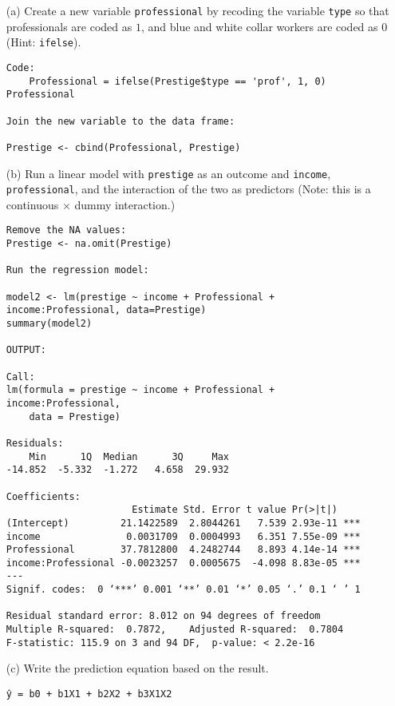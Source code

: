 \documentclass[12pt,letterpaper]{article}
\begin{document}
\newpage
\begin{enumerate}
	
	\item [(a)]
	Create a new variable \texttt{professional} by recoding the variable \texttt{type} so that professionals are coded as $1$, and blue and white collar workers are coded as $0$ (Hint: \texttt{ifelse}).
	
	\vspace{1cm}
\begin{verbatim}
Code:
    Professional = ifelse(Prestige$type == 'prof', 1, 0)
Professional

Join the new variable to the data frame:

Prestige <- cbind(Professional, Prestige)
\end{verbatim}
	
	\item [(b)]
	Run a linear model with \texttt{prestige} as an outcome and \texttt{income}, \texttt{professional}, and the interaction of the two as predictors (Note: this is a continuous $\times$ dummy interaction.)
	
	\vspace{1cm}

\begin{verbatim}
Remove the NA values:
Prestige <- na.omit(Prestige)

Run the regression model:

model2 <- lm(prestige ~ income + Professional + income:Professional, data=Prestige)
summary(model2)

OUTPUT:

Call:
lm(formula = prestige ~ income + Professional + income:Professional, 
    data = Prestige)

Residuals:
    Min      1Q  Median      3Q     Max 
-14.852  -5.332  -1.272   4.658  29.932 

Coefficients:
                      Estimate Std. Error t value Pr(>|t|)    
(Intercept)         21.1422589  2.8044261   7.539 2.93e-11 ***
income               0.0031709  0.0004993   6.351 7.55e-09 ***
Professional        37.7812800  4.2482744   8.893 4.14e-14 ***
income:Professional -0.0023257  0.0005675  -4.098 8.83e-05 ***
---
Signif. codes:  0 ‘***’ 0.001 ‘**’ 0.01 ‘*’ 0.05 ‘.’ 0.1 ‘ ’ 1

Residual standard error: 8.012 on 94 degrees of freedom
Multiple R-squared:  0.7872,	Adjusted R-squared:  0.7804 
F-statistic: 115.9 on 3 and 94 DF,  p-value: < 2.2e-16
\end{verbatim}
	\item [(c)]
	Write the prediction equation based on the result.
\begin{verbatim}
ŷ = b0 + b1X1 + b2X2 + b3X1X2


\end{verbatim}
\end{enumerate}
\end{document}

